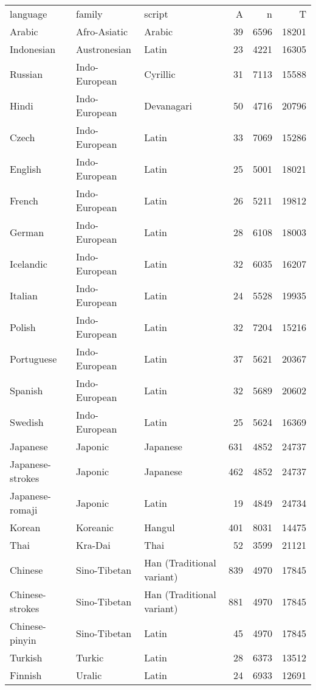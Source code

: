 \begin{table}[ht]
\centering
\begin{tabular}{lllrrr}
 language & family & script & A & n & T \\ 
 Arabic & Afro-Asiatic & Arabic &  39 & 6596 & 18201 \\ 
  Indonesian & Austronesian & Latin &  23 & 4221 & 16305 \\ 
  Russian & Indo-European & Cyrillic &  31 & 7113 & 15588 \\ 
  Hindi & Indo-European & Devanagari &  50 & 4716 & 20796 \\ 
  Czech & Indo-European & Latin &  33 & 7069 & 15286 \\ 
  English & Indo-European & Latin &  25 & 5001 & 18021 \\ 
  French & Indo-European & Latin &  26 & 5211 & 19812 \\ 
  German & Indo-European & Latin &  28 & 6108 & 18003 \\ 
  Icelandic & Indo-European & Latin &  32 & 6035 & 16207 \\ 
  Italian & Indo-European & Latin &  24 & 5528 & 19935 \\ 
  Polish & Indo-European & Latin &  32 & 7204 & 15216 \\ 
  Portuguese & Indo-European & Latin &  37 & 5621 & 20367 \\ 
  Spanish & Indo-European & Latin &  32 & 5689 & 20602 \\ 
  Swedish & Indo-European & Latin &  25 & 5624 & 16369 \\ 
  Japanese & Japonic & Japanese & 631 & 4852 & 24737 \\ 
  Japanese-strokes & Japonic & Japanese & 462 & 4852 & 24737 \\ 
  Japanese-romaji & Japonic & Latin &  19 & 4849 & 24734 \\ 
  Korean & Koreanic & Hangul & 401 & 8031 & 14475 \\ 
  Thai & Kra-Dai & Thai &  52 & 3599 & 21121 \\ 
  Chinese & Sino-Tibetan & Han (Traditional variant) & 839 & 4970 & 17845 \\ 
  Chinese-strokes & Sino-Tibetan & Han (Traditional variant) & 881 & 4970 & 17845 \\ 
  Chinese-pinyin & Sino-Tibetan & Latin &  45 & 4970 & 17845 \\ 
  Turkish & Turkic & Latin &  28 & 6373 & 13512 \\ 
  Finnish & Uralic & Latin &  24 & 6933 & 12691 \\ 
   \hline
\end{tabular}
\end{table}
